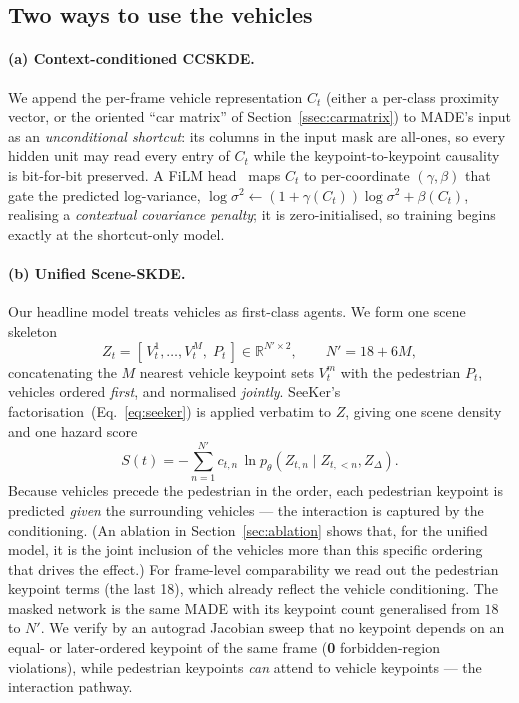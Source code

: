 \documentclass{article}
\begin{document}
\subsection{Two ways to use the vehicles}
\paragraph{(a) Context-conditioned CCSKDE.} We append the per-frame vehicle
representation $C_t$ (either a per-class proximity vector, or the oriented
``car matrix'' of Section~\ref{ssec:carmatrix}) to MADE's input as an
\emph{unconditional shortcut}: its columns in the input mask are all-ones, so
every hidden unit may read every entry of $C_t$ while the keypoint-to-keypoint
causality is bit-for-bit preserved. A FiLM head~\citep{perez2018film} maps $C_t$
to per-coordinate $(\gamma,\beta)$ that gate the predicted log-variance,
$\log\sigma^2\leftarrow(1{+}\gamma(C_t))\log\sigma^2+\beta(C_t)$, realising a
\emph{contextual covariance penalty}; it is zero-initialised, so training begins
exactly at the shortcut-only model.

\paragraph{(b) Unified Scene-SKDE.} Our headline model treats vehicles as
first-class agents. We form one scene skeleton
\begin{equation}
\label{eq:scene}
Z_t=[\,V^1_t,\dots,V^M_t,\;P_t\,]\in\mathbb{R}^{N'\times 2},\qquad N'=18+6M,
\end{equation}
concatenating the $M$ nearest vehicle keypoint sets $V^m_t$ with the pedestrian
$P_t$, vehicles ordered \emph{first}, and normalised \emph{jointly}. SeeKer's
factorisation~(Eq.~\ref{eq:seeker}) is applied verbatim to $Z$, giving one scene
density and one hazard score
\begin{equation}
\label{eq:scene_score}
S(t)=-\sum_{n=1}^{N'} c_{t,n}\,\ln p_\theta\!\left(Z_{t,n}\mid Z_{t,<n},Z_\Delta\right).
\end{equation}
Because vehicles precede the pedestrian in the order, each pedestrian keypoint is
predicted \emph{given} the surrounding vehicles --- the interaction is captured by
the conditioning. (An ablation in Section~\ref{sec:ablation} shows that, for the
unified model, it is the joint inclusion of the vehicles more than this specific
ordering that drives the effect.) For frame-level comparability we read out the pedestrian
keypoint terms (the last 18), which already reflect the vehicle conditioning. The
masked network is the same MADE with its keypoint count generalised from $18$ to
$N'$. We verify by an autograd Jacobian sweep that no keypoint depends on an
equal- or later-ordered keypoint of the same frame (\textbf{0} forbidden-region
violations), while pedestrian keypoints \emph{can} attend to vehicle keypoints
--- the interaction pathway.
\end{document}
